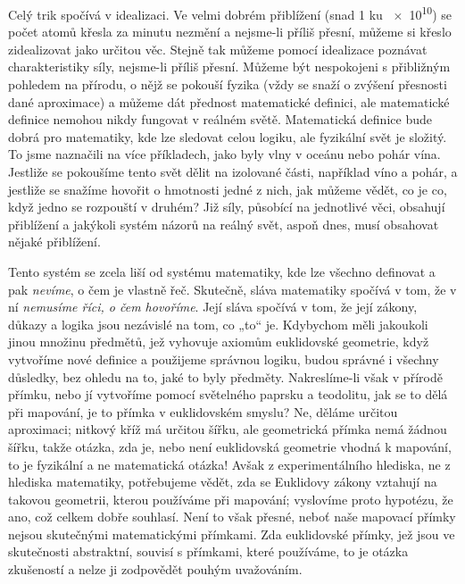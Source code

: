     Celý trik spočívá v idealizaci. Ve velmi dobrém přiblížení (snad 1 ku \num{e10}) se počet atomů 
    křesla za minutu nezmění a nejsme-li příliš přesní, můžeme si křeslo zidealizovat jako určitou 
    věc. Stejně tak můžeme pomocí idealizace poznávat charakteristiky síly, nejsme-li příliš 
    přesní. Můžeme být nespokojeni s přibližným pohledem na přírodu, o nějž se pokouší fyzika (vždy 
    se snaží o zvýšení přesnosti dané aproximace) a můžeme dát přednost matematické definici, ale 
    matematické definice nemohou nikdy fungovat v reálném světě. Matematická definice bude dobrá 
    pro matematiky, kde lze sledovat celou logiku, ale fyzikální svět je složitý. To jsme naznačili 
    na více příkladech, jako byly vlny v oceánu nebo pohár vína. Jestliže se pokoušíme tento svět 
    dělit na izolované části, například víno a pohár, a jestliže se snažíme hovořit o hmotnosti 
    jedné z nich, jak můžeme vědět, co je co, když jedno se rozpouští v druhém? Již síly, působící 
    na jednotlivé věci, obsahují přiblížení a jakýkoli systém názorů na reálný svět, aspoň dnes, 
    musí obsahovat nějaké přiblížení.
    
    Tento systém se zcela liší od systému matematiky, kde lze všechno definovat a pak 
    \emph{nevíme}, o čem je vlastně řeč. Skutečně, sláva matematiky spočívá v tom, že v ní 
    \emph{nemusíme říci, o čem hovoříme}. Její sláva spočívá v tom, že její zákony, důkazy a logika 
    jsou nezávislé na tom, co „to“ je. Kdybychom měli jakoukoli jinou množinu předmětů, jež 
    vyhovuje axiomům euklidovské geometrie, když vytvoříme nové definice a použijeme správnou 
    logiku, budou správné i všechny důsledky, bez ohledu na to, jaké to byly předměty. 
    Nakreslíme-li však v přírodě přímku, nebo jí vytvoříme pomocí světelného paprsku a teodolitu, 
    jak se to dělá při mapování, je to přímka v euklidovském smyslu? Ne, děláme určitou aproximaci; 
    nitkový kříž má určitou šířku, ale geometrická přímka nemá žádnou šířku, takže otázka, zda je, 
    nebo není euklidovská geometrie vhodná k mapování, to je fyzikální a ne matematická otázka! 
    Avšak z experimentálního hlediska, ne z hlediska matematiky, potřebujeme vědět, zda se 
    Euklidovy zákony vztahují na takovou geometrii, kterou používáme při mapování; vyslovíme proto 
    hypotézu, že ano, což celkem dobře souhlasí. Není to však přesné, neboť naše mapovací přímky 
    nejsou skutečnými matematickými přímkami. Zda euklidovské přímky, jež jsou ve skutečnosti 
    abstraktní, souvisí s přímkami, které používáme, to je otázka zkušeností a nelze ji zodpovědět 
    pouhým uvažováním.
    
